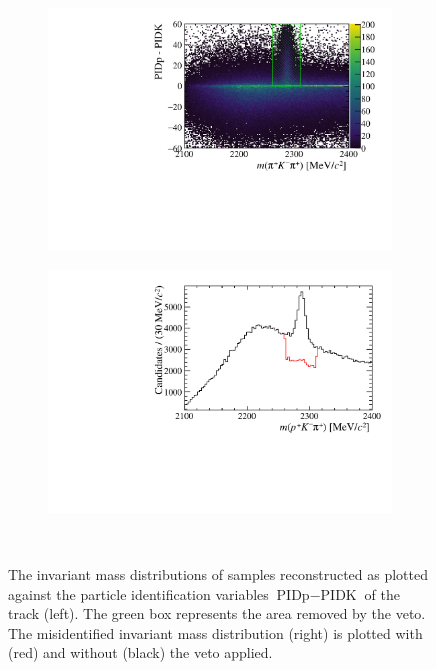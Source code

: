 \begin{figure}[!h]
    \centering
    \begin{subfigure}[t]{0.49\textwidth}
        \includegraphics[width=1.0\textwidth]{figs/Selection/B2DsPhi_Ds2KKPi_2D_Lc_Veto_NoBDT.pdf}
    \end{subfigure}%
    \begin{subfigure}[t]{0.49\textwidth}
        \includegraphics[width=1.0\textwidth]{figs/Selection/B2DsPhi_Ds2KKPi_Lc_Veto_NoBDT.pdf}
    \end{subfigure}\\
    \caption{The invariant mass distributions of \decay{\Dsp}{\Kp\Km\pip} samples reconstructed as \decay{\Lc}{\Pp\Km\pip} plotted against the particle identification variables $\text{PIDp}-\text{PIDK}$ of the \Kp track (left). The green box represents the area removed by the veto. The misidentified invariant mass distribution (right) is plotted with (red) and without (black) the veto applied.}
    \label{fig:PIDVetos_Ds2KKPi_Lc_Veto}   
\end{figure}



